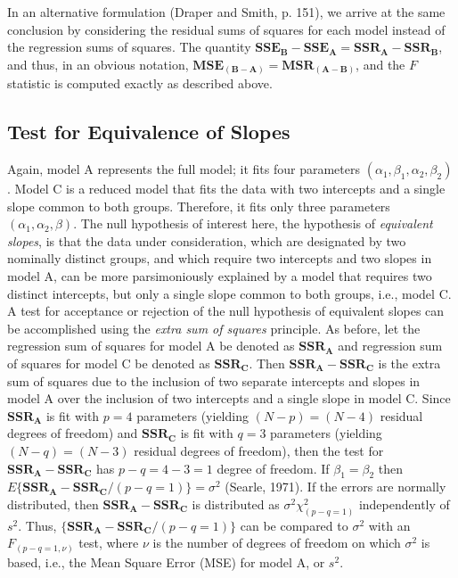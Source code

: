 \documentclass[11pt, oneside]{article}   	%
\begin{document}
\vspace{2 mm}

In an alternative formulation (Draper and Smith, p. 151), we arrive at the same conclusion by considering the residual sums of squares for each model instead of the regression sums of squares.  The quantity $ \mathbf{ SSE_{B}} - \mathbf{SSE_{A} }  =   \mathbf{SSR_{A}} -  \mathbf{SSR_{B}}  $, and thus, in an obvious notation, $ \mathbf{ MSE_{(B-A)}}   =  \mathbf{MSR_{(A-B)}} $, and the $  F  $ statistic is computed exactly as described above.
\bigskip

\subsection{Test for Equivalence of Slopes}
Again, model A represents the full model; it fits four parameters $  (\alpha_{1}, \beta_{1}, \alpha_{2}, \beta_{2}) $. Model C is a reduced model that fits the data with two intercepts and a single slope common to both groups.  Therefore, it fits only three parameters $  (\alpha_{1},  \alpha_{2}, \beta)  $.  The null hypothesis of interest here, the hypothesis of \emph{equivalent slopes}, is that the data under consideration, which are designated by two nominally distinct groups, and which require two intercepts and two slopes in model A, can be more parsimoniously explained by a model that requires two distinct intercepts, but only a single slope common to both groups, i.e., model C.  A test for acceptance or rejection of the null hypothesis of equivalent slopes can be accomplished using the \emph{extra sum of squares} principle. As before, let the regression sum of squares for model A be denoted as $ \mathbf{SSR_{A}} $ and regression sum of squares for model C be denoted as $ \mathbf{SSR_{C}} $. Then $ \mathbf{SSR_{A}} -  \mathbf{SSR_{C}} $ is the extra sum of squares due to the inclusion of two separate intercepts and slopes in model A over the inclusion of two intercepts and a single slope in model C. Since  $ \mathbf{SSR_{A}} $ is fit with $ p = 4 $ parameters (yielding $ (N - p) = (N - 4) $ residual degrees of freedom) and  $  \mathbf{SSR_{C}} $ is fit with $ q = 3 $ parameters (yielding $  (N - q) = (N - 3) $ residual degrees of freedom), then the test for $ \mathbf{SSR_{A}} -  \mathbf{SSR_{C}} $ has $  p - q = 4 - 3 = 1  $ degree of freedom.  If $ \beta_{1} = \beta_ {2} $ then $ E\{  \mathbf{SSR_{A}} -  \mathbf{SSR_{C}}   / (p - q = 1) \} = \sigma^{2} $ (Searle, 1971).  If the errors are normally distributed, then $ \mathbf{SSR_{A}} -  \mathbf{SSR_{C}} $ is distributed as  $ \sigma^{2} \chi^{2}_{(p-q=1)}  $ independently of $ s^{2}  $.  Thus, $ \{  \mathbf{SSR_{A}} -  \mathbf{SSR_{C}}   / (p - q = 1) \} $ can be compared to $ \sigma^{2} $ with an $ F_(p-q =1, \nu) $ test, where $ \nu $ is the number of degrees of freedom on which $ \sigma^{2} $ is based, i.e., the Mean Square Error (MSE) for model A, or $  s^2 $.  
\vspace{2 mm}
 
\end{document}

